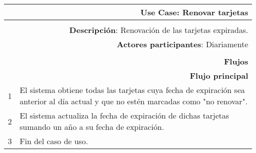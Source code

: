 \begin{tabularx}{\textwidth}{| r | X |}
\hline
\multicolumn{2}{|X|}{
\textbf{Use Case}: Renovar tarjetas} \\

\hline
\multicolumn{2}{|c|}{\cellcolor[gray]{0.6}} \\

\hline
\multicolumn{2}{|X|}{
\textbf{Descripción}: Renovación de las tarjetas expiradas.} \\

\hline
\multicolumn{2}{|X|}{
\textbf{Actores participantes}: Diariamente} \\

\hline
\multicolumn{2}{|c|}{\cellcolor[gray]{0.6} } \\

\hline
\multicolumn{2}{|X|}{
\textbf{Flujos}} \\

\hline
\multicolumn{2}{|X|}{
\textbf{Flujo principal}} \\

\hline
1 & El sistema obtiene todas las tarjetas cuya fecha de expiración sea anterior
al día actual y que no estén marcadas como "no renovar". \\
\hline
2 & El sistema actualiza la fecha de expiración de dichas tarjetas sumando un año a su fecha de expiración. \\
\hline
3 & Fin del caso de uso. \\

\hline
\end{tabularx}

